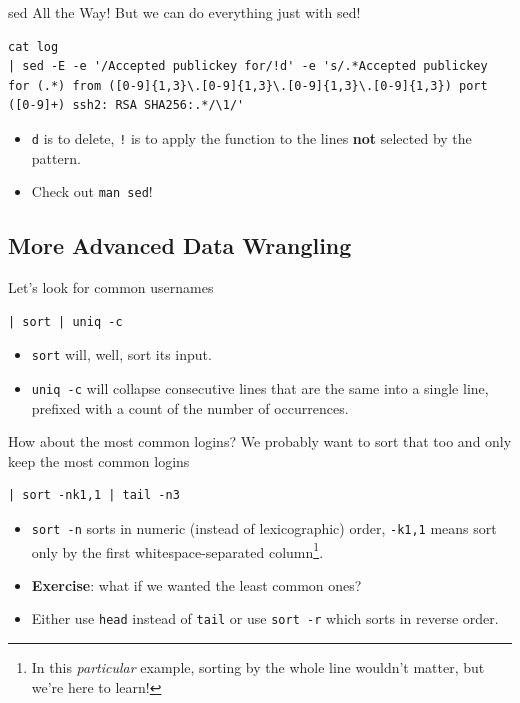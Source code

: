 \documentclass[12pt]{beamer}
\begin{document}
\begin{frame}[fragile]{sed All the Way!}
  But we can do everything just with sed!
  \begin{verbatim}
cat log
| sed -E -e '/Accepted publickey for/!d' -e 's/.*Accepted publickey for (.*) from ([0-9]{1,3}\.[0-9]{1,3}\.[0-9]{1,3}\.[0-9]{1,3}) port ([0-9]+) ssh2: RSA SHA256:.*/\1/'
  \end{verbatim}
  \begin{itemize}
    \item \texttt{d} is to delete, \texttt{!} is to apply the function to the lines \textbf{not} selected by the pattern.
    \item Check out \texttt{man sed}!
  \end{itemize}
\end{frame}

\subsection{More Advanced Data Wrangling}
\begin{frame}[fragile]{Let's look for common usernames}
  \begin{verbatim}
| sort | uniq -c
  \end{verbatim}
  \begin{itemize}
    \item \texttt{sort} will, well, sort its input.
    \item \texttt{uniq -c} will collapse consecutive lines that are the same into a single line, prefixed with a count of the number of occurrences.
  \end{itemize}
\end{frame}

\begin{frame}[fragile]{How about the most common logins?}
  We probably want to sort that too and only keep the most common logins
  \begin{verbatim}
| sort -nk1,1 | tail -n3
  \end{verbatim}
  \begin{itemize}
    \item \texttt{sort -n} sorts in numeric (instead of lexicographic) order, \texttt{-k1,1} means sort only by the first whitespace-separated column\footnote{In this \emph{particular} example, sorting by the whole line wouldn’t matter, but we’re here to learn!}.
    \item \textbf{Exercise}: what if we wanted the least common ones?\pause
    \item Either use \texttt{head} instead of \texttt{tail} or use \texttt{sort -r} which sorts in reverse order.
  \end{itemize}
\end{frame}
\end{document}
